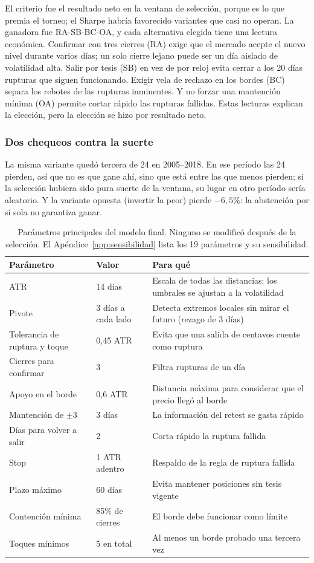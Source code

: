 \documentclass[10pt,a4paper]{article}
\begin{document}
El criterio fue el resultado neto en la ventana de selección, porque es lo que premia
el torneo; el Sharpe habría favorecido variantes que casi no operan. La ganadora fue
RA-SB-BC-OA, y cada alternativa elegida tiene una lectura económica. Confirmar con tres
cierres (RA) exige que el mercado acepte el nuevo nivel durante varios días; un solo
cierre lejano puede ser un día aislado de volatilidad alta. Salir por tesis (SB) en vez
de por reloj evita cerrar a los 20 días rupturas que siguen funcionando. Exigir vela de
rechazo en los bordes (BC) separa los rebotes de las rupturas inminentes. Y no forzar
una mantención mínima (OA) permite cortar rápido las rupturas fallidas. Estas lecturas
explican la elección, pero la elección se hizo por resultado neto.

\subsubsection{Dos chequeos contra la suerte}

La misma variante quedó tercera de 24 en 2005--2018. En ese período las 24 pierden, así
que no es que gane ahí, sino que está entre las que menos pierden; si la selección
hubiera sido pura suerte de la ventana, su lugar en otro período sería aleatorio. Y la
variante opuesta (invertir la peor) pierde $-6{,}5\%$: la abstención por sí sola no
garantiza ganar.

\begin{table}[htb]\centering\small
\renewcommand{\arraystretch}{1.08}
\begin{tabularx}{\textwidth}{@{}llX@{}}
\toprule
Parámetro & Valor & Para qué \\
\midrule
ATR & 14 días & Escala de todas las distancias: los umbrales se ajustan a la volatilidad \\
Pivote & 3 días a cada lado & Detecta extremos locales sin mirar el futuro (rezago de 3 días) \\
Tolerancia de ruptura y toque & 0,45 ATR & Evita que una salida de centavos cuente como ruptura \\
Cierres para confirmar & 3 & Filtra rupturas de un día \\
Apoyo en el borde & 0,6 ATR & Distancia máxima para considerar que el precio llegó al borde \\
Mantención de $\pm3$ & 3 días & La información del retest se gasta rápido \\
Días para volver a salir & 2 & Corta rápido la ruptura fallida \\
Stop & 1 ATR adentro & Respaldo de la regla de ruptura fallida \\
Plazo máximo & 60 días & Evita mantener posiciones sin tesis vigente \\
Contención mínima & 85\% de cierres & El borde debe funcionar como límite \\
Toques mínimos & 5 en total & Al menos un borde probado una tercera vez \\
\bottomrule
\end{tabularx}
\caption{Parámetros principales del modelo final. Ninguno se modificó después de la
selección. El Apéndice~\ref{app:sensibilidad} lista los 19 parámetros y su
sensibilidad.}\label{tab:param}
\end{table}
\end{document}

